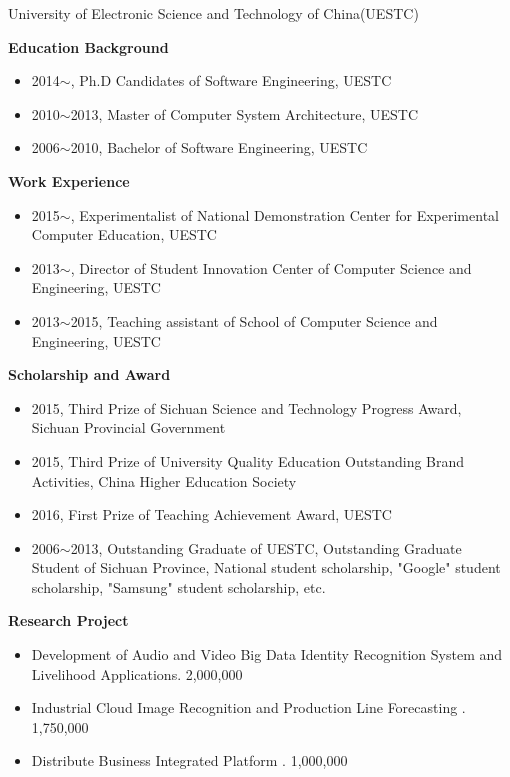 \documentclass{mcmthesis}
\begin{document}
University of Electronic Science and Technology of China(UESTC)

\textbf{Education Background}

\begin{itemize}
	\item 2014$\sim$, Ph.D Candidates of Software Engineering, UESTC
	\item 2010$\sim$2013, Master of Computer System Architecture, UESTC
	\item 2006$\sim$2010, Bachelor of Software Engineering, UESTC
\end{itemize}

\textbf{Work Experience}

\begin{itemize}
	\item 2015$\sim$, Experimentalist of National Demonstration Center for Experimental Computer Education, UESTC
	\item 2013$\sim$, Director of Student Innovation Center of Computer Science and Engineering, UESTC
	\item 2013$\sim$2015, Teaching assistant of School of Computer Science and Engineering, UESTC
\end{itemize}

\textbf{Scholarship and Award}

\begin{itemize}
	\item 2015, Third Prize of Sichuan Science and Technology Progress Award, Sichuan Provincial Government
	\item 2015, Third Prize of University Quality Education Outstanding Brand Activities, China Higher Education Society
	\item 2016, First Prize of Teaching Achievement Award, UESTC
	\item 2006$\sim$2013, Outstanding Graduate of UESTC, Outstanding Graduate Student of Sichuan Province, National student scholarship, "Google" student scholarship, "Samsung" student scholarship, etc.
\end{itemize}

\textbf{Research Project}

\begin{itemize}
	\item Development of Audio and Video Big Data Identity Recognition System and Livelihood Applications. 2,000,000
	\item Industrial Cloud Image Recognition and Production Line Forecasting . 1,750,000
	\item Distribute Business Integrated Platform . 1,000,000
\end{itemize}
\end{document}
